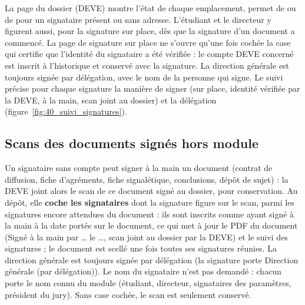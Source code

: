 \documentclass[11pt,a4paper]{article}
\begin{document}
La page  du dossier (DEVE) montre l'état de chaque
emplacement, permet de  ou de 
pour un signataire présent ou sans adresse. L'étudiant et le directeur y
figurent aussi, pour la signature sur place, dès que la signature d'un document
a commencé. La page de signature sur place ne s'ouvre qu'une fois cochée la case
qui certifie que l'identité du signataire a été vérifiée : le compte DEVE
concerné est inscrit à l'historique et conservé avec la signature. La direction
générale est toujours signée par délégation, avec le nom de la personne qui
signe. Le suivi précise pour chaque signature la manière de signer
(\og sur place, identité vérifiée par la DEVE\fg{}, \og à la main, scan joint au
dossier\fg{}) et la délégation (figure~\ref{fig:40_suivi_signatures}).



\subsection{Scans des documents signés hors module}\label{sec:scans}

Un signataire sans compte peut signer à la main un document (contrat de
diffusion, fiche d'agréments, fiche signalétique, conclusions, dépôt de sujet) :
la DEVE joint alors le scan de ce document signé au dossier, pour conservation.
Au dépôt, elle \textbf{coche les signataires} dont la signature figure sur le
scan, parmi les signatures encore attendues du document : ils sont inscrits comme
ayant signé à la main à la date portée sur le document, ce qui met à jour le PDF
du document (\og Signé à la main par \ldots{} le \ldots, scan joint au dossier
par la DEVE\fg{}) et le suivi des signatures ; le document est scellé une fois
toutes ses signatures réunies. La direction générale est toujours signée par
délégation (la signature porte \og Direction générale (par délégation)\fg{}).
Le nom du signataire n'est pas demandé : chacun porte le nom
connu du module (étudiant, directeur, signataires des paramètres, président du
jury). Sans case cochée, le scan est seulement conservé.
\end{document}
